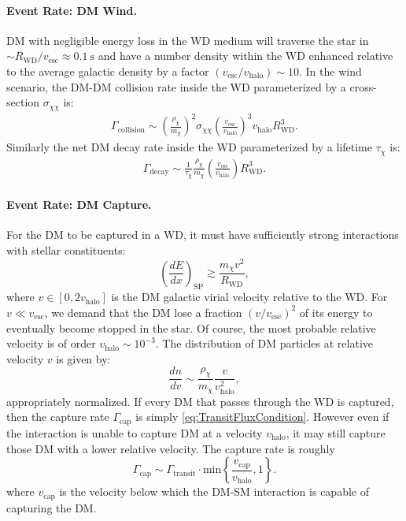 \documentclass[preprintnumbers,amsmath,amssymb,prd,superscriptaddress]{revtex4}
\def\r{\right)}
\def\l{\left(}
\begin{document}
\paragraph{Event Rate: DM Wind.}
DM with negligible energy loss in the WD medium will traverse the star in $\sim R_\text{WD}/v_\text{esc} \approx 0.1 ~\text{s}$ and have a number density within the WD enhanced relative to the average galactic density by a factor $(v_\text{esc}/v_\text{halo}) \sim 10$.
In the wind scenario, the DM-DM collision rate inside the WD parameterized by a cross-section $\sigma_{\chi \chi}$ is:
\begin{align}
  \Gamma_\text{collision}
  \sim \l \frac{\rho_\chi}{m_\chi} \r^2 \sigma_{\chi \chi} \l \frac{v_\text{esc}}{v_\text{halo}}\r^3 v_\text{halo} R_\text{WD}^3.
  \label{eq:collisionDM}
\end{align}
Similarly the net DM decay rate inside the WD parameterized by a lifetime $\tau_\chi$ is:
\begin{align}
 \Gamma_\text{decay}
   \sim \frac{1}{\tau_\chi} \frac{\rho_{\chi}}{m_\chi} \l \frac{v_\text{esc}}{v_\text{halo}}\r R_\text{WD}^3.
  \label{eq:decayDM}
\end{align}

\paragraph{Event Rate: DM Capture.}
For the DM to be captured in a WD, it must have sufficiently strong interactions with stellar constituents:
\begin{equation}
\label{eq:capture}
\left( \frac{d E}{d x} \right)_\text{SP} \gtrsim \frac{m_\chi v^2}{R_\text{WD}},
\end{equation}
where $v \in [0, 2 v_\text{halo}]$ is the DM galactic virial velocity relative to the WD.  
For $v \ll v_\text{esc}$, we demand that the DM lose a fraction $(v/v_\text{esc})^2$ of its energy to eventually become stopped in the star. 
Of course, the most probable relative velocity is of order $v_\text{halo} \sim 10^{-3}$.
The distribution of DM particles at relative velocity $v$ is given by:
\begin{equation}
\frac{dn}{dv} \sim \frac{\rho_\chi}{m_\chi} \frac{v}{v_\text{halo}^2},
\end{equation}
appropriately normalized. 
If every DM that passes through the WD is captured, then the capture rate $\Gamma_\text{cap}$ is simply \eqref{eq:TransitFluxCondition}. 
However even if the interaction is unable to capture DM at a velocity $v_\text{halo}$, it may still capture those DM with a lower relative velocity.
The capture rate is roughly
\begin{equation}
\Gamma_\text{cap} \sim \Gamma_\text{transit} \cdot \text{min} \left \{ \frac{v_\text{cap}}{v_\text{halo}}, 1\right \}. 
\end{equation}
where $v_\text{cap}$ is the velocity below which the DM-SM interaction is capable of capturing the DM. 
\end{document}
